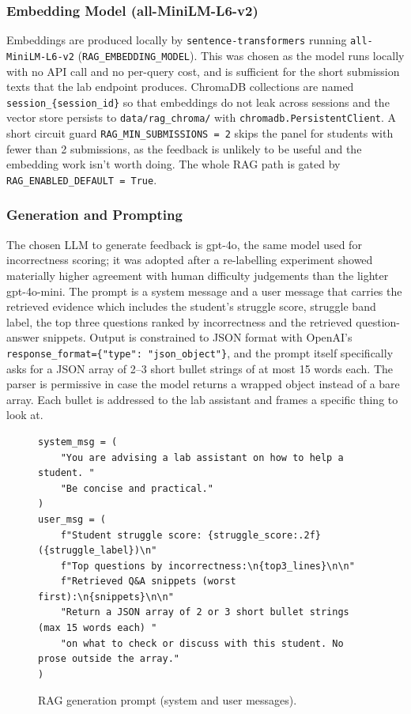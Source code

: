 \subsubsection{Embedding Model (all-MiniLM-L6-v2)}

Embeddings are produced locally by \texttt{sentence-transformers} running \texttt{all-MiniLM-L6-v2} (\texttt{RAG\_EMBEDDING\_MODEL}).
This was chosen as the model runs locally with no API call and no per-query cost, and is sufficient for the short submission texts that the lab endpoint produces.
ChromaDB collections are named \texttt{session\_\{session\_id\}} so that embeddings do not leak across sessions and the vector store persists to \texttt{data/rag\_chroma/} with \texttt{chromadb.PersistentClient}.
A short circuit guard \texttt{RAG\_MIN\_SUBMISSIONS = 2} skips the panel for students with fewer than 2 submissions, as the feedback is unlikely to be useful and the embedding work isn't worth doing.
The whole RAG path is gated by \texttt{RAG\_ENABLED\_DEFAULT = True}.

\subsubsection{Generation and Prompting}

The chosen LLM to generate feedback is gpt-4o, the same model used for incorrectness scoring; it was adopted after a re-labelling experiment showed materially higher agreement with human difficulty judgements than the lighter gpt-4o-mini.
The prompt is a system message and a user message that carries the retrieved evidence which includes the student's struggle score, struggle band label, the top three questions ranked by incorrectness and the retrieved question-answer snippets.
Output is constrained to JSON format with OpenAI's \texttt{response\_format=\{"type": "json\_object"\}}, and the prompt itself specifically asks for a JSON array of 2--3 short bullet strings of at most 15 words each.
The parser is permissive in case the model returns a wrapped object instead of a bare array.
Each bullet is addressed to the lab assistant and frames a specific thing to look at.


\begin{figure}[H]
    \centering
    \begin{minipage}{0.92\linewidth}
\begin{lstlisting}[firstnumber=263]
system_msg = (
    "You are advising a lab assistant on how to help a student. "
    "Be concise and practical."
)
user_msg = (
    f"Student struggle score: {struggle_score:.2f} ({struggle_label})\n"
    f"Top questions by incorrectness:\n{top3_lines}\n\n"
    f"Retrieved Q&A snippets (worst first):\n{snippets}\n\n"
    "Return a JSON array of 2 or 3 short bullet strings (max 15 words each) "
    "on what to check or discuss with this student. No prose outside the array."
)
\end{lstlisting}
    \end{minipage}
    \caption{RAG generation prompt (system and user messages).}
    \label{fig:code-ragprompt}
\end{figure}


